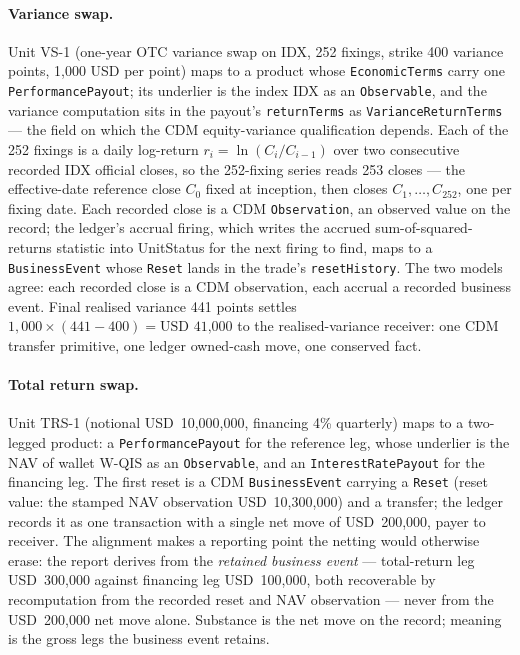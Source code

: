 \documentclass[11pt,a4paper]{article}
\newcommand{\USD}[1]{\mbox{USD~#1}}
\begin{document}
\paragraph{Variance swap.} Unit VS-1 (one-year OTC variance swap on IDX, 252
fixings, strike 400 variance points, 1{,}000 USD per point) maps to a product
whose \texttt{EconomicTerms} carry one \texttt{PerformancePayout}; its underlier
is the index IDX as an \texttt{Observable}, and the variance computation sits in
the payout's \texttt{returnTerms} as \texttt{VarianceReturnTerms} --- the field on
which the CDM equity-variance qualification depends. Each of the 252 fixings is a daily log-return $r_i = \ln(C_i/C_{i-1})$ over two
consecutive recorded IDX official closes, so the 252-fixing series reads 253
closes --- the effective-date reference close $C_0$ fixed at inception, then
closes $C_1,\dots,C_{252}$, one per fixing date. Each recorded close is a CDM
\texttt{Observation}, an observed value on the record; the ledger's accrual firing, which writes the accrued
sum-of-squared-returns statistic into UnitStatus for the next firing to find,
maps to a \texttt{BusinessEvent} whose \texttt{Reset} lands in the trade's
\texttt{resetHistory}. The two models agree: each recorded close is a CDM observation, each accrual a
recorded business event. Final realised variance 441 points settles $1{,}000 \times (441-400) =
\USD{41{,}000}$ to the realised-variance receiver: one CDM transfer primitive,
one ledger owned-cash move, one conserved fact.

\paragraph{Total return swap.} Unit TRS-1 (notional \USD{10{,}000{,}000},
financing 4\% quarterly) maps to a two-legged product: a
\texttt{PerformancePayout} for the reference leg, whose underlier is the NAV of
wallet W-QIS as an \texttt{Observable}, and an \texttt{InterestRatePayout} for the
financing leg. The first reset is a CDM \texttt{BusinessEvent} carrying a
\texttt{Reset} (reset value: the stamped NAV observation \USD{10{,}300{,}000})
and a transfer; the ledger records it as one transaction with a single net move
of \USD{200{,}000}, payer to receiver. The alignment makes a reporting point the
netting would otherwise erase: the report derives from the \emph{retained
business event} --- total-return leg \USD{300{,}000} against financing leg
\USD{100{,}000}, both recoverable by recomputation from the recorded reset and
NAV observation --- never from the \USD{200{,}000} net move alone. Substance is
the net move on the record; meaning is the gross legs the business event retains.
\end{document}
